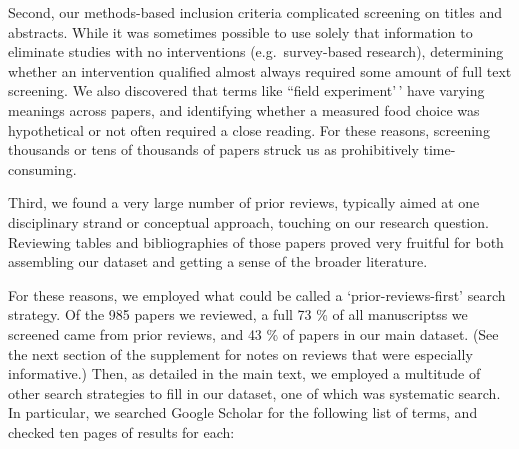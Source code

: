 \documentclass[sn-nature,referee,pdflatex]{sn-jnl}
\begin{document}
Second, our methods-based inclusion criteria complicated screening on
titles and abstracts. While it was sometimes possible to use solely that
information to eliminate studies with no interventions
(e.g.~survey-based research), determining whether an intervention
qualified almost always required some amount of full text screening. We
also discovered that terms like ``field experiment'\,' have varying
meanings across papers, and identifying whether a measured food choice
was hypothetical or not often required a close reading. For these
reasons, screening thousands or tens of thousands of papers struck us as
prohibitively time-consuming.

Third, we found a very large number of prior reviews, typically aimed at
one disciplinary strand or conceptual approach, touching on our research
question. Reviewing tables and bibliographies of those papers proved
very fruitful for both assembling our dataset and getting a sense of the
broader literature.

For these reasons, we employed what could be called a
`prior-reviews-first' search strategy. Of the 985 papers we reviewed, a
full 73 \% of all manuscriptss we screened came from prior reviews, and
43 \% of papers in our main dataset. (See the next section of the
supplement for notes on reviews that were especially informative.) Then,
as detailed in the main text, we employed a multitude of other search
strategies to fill in our dataset, one of which was systematic search.
In particular, we searched Google Scholar for the following list of
terms, and checked ten pages of results for each:
\end{document}
